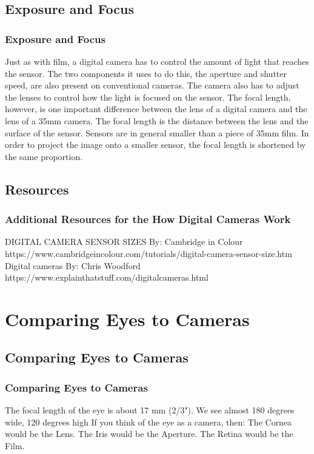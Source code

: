 \documentclass{beamer}
\begin{document}
\subsection{Exposure and Focus}		
\begin{frame}
	\frametitle{Exposure and Focus}
	\begin{outline}
	\1 Just as with film, a digital camera has to control the amount of light that reaches the sensor. 
	\2 The two components it uses to do this, the aperture and shutter speed, are also present on conventional cameras.
	\1 The camera also has to adjust the lenses to control how the light is focused on the sensor. 
	\1 The focal length, however, is one important difference between the lens of a digital camera and the lens of a 35mm camera. 
	\2 The focal length is the distance between the lens and the surface of the sensor. 
	\2 Sensors are in general smaller than a piece of 35mm film. 
	\2 In order to project the image onto a smaller sensor, the focal length is shortened by the same proportion. 
\end{outline}
\end{frame}

\subsection{Resources}		
	\begin{frame}
		\frametitle{Additional Resources for the How Digital Cameras Work}
		\begin{outline}
			\1 DIGITAL CAMERA SENSOR SIZES
			\2  By:  Cambridge in Colour
			\2 https://www.cambridgeincolour.com/tutorials/digital-camera-sensor-size.htm
			\1 Digital cameras
			\2  By:  Chris Woodford
			\2 https://www.explainthatstuff.com/digitalcameras.html
		\end{outline}
	\end{frame}

\section{Comparing Eyes to Cameras}		
\subsection{Comparing Eyes to Cameras}		

\begin{frame}
	\frametitle{Comparing Eyes to Cameras}
	\begin{outline}
		\1 The focal length of the eye is about 17 mm (2/3"). 
		\1 We see almost 180 degrees wide, 120 degrees high
		\1 If you think of the eye as a camera, then: 
		\2 The Cornea would be the Lens.
		\2 The Iris would be the Aperture.  
		\2 The Retina would be the Film.
	\end{outline}
\end{frame}
	
\end{document}
